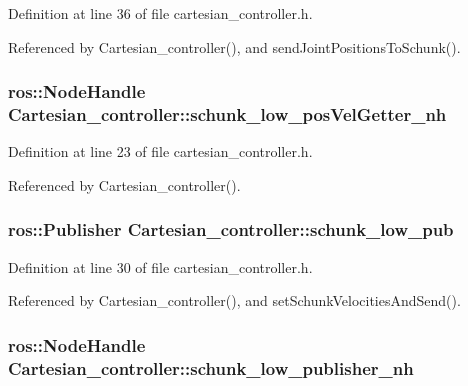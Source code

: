 Definition at line 36 of file cartesian\-\_\-controller.\-h.



Referenced by Cartesian\-\_\-controller(), and send\-Joint\-Positions\-To\-Schunk().

\hypertarget{classCartesian__controller_aeed01809bd5240663c7acfade245a386}{
\subsubsection[{schunk\-\_\-low\-\_\-pos\-Vel\-Getter\-\_\-nh}]{\setlength{\rightskip}{0pt plus 5cm}ros\-::\-Node\-Handle Cartesian\-\_\-controller\-::schunk\-\_\-low\-\_\-pos\-Vel\-Getter\-\_\-nh\hspace{0.3cm}{\ttfamily [protected]}}}\label{classCartesian__controller_aeed01809bd5240663c7acfade245a386}


Definition at line 23 of file cartesian\-\_\-controller.\-h.



Referenced by Cartesian\-\_\-controller().

\hypertarget{classCartesian__controller_aa6ce9cffdd307127ed814d6e5132eba2}{
\subsubsection[{schunk\-\_\-low\-\_\-pub}]{\setlength{\rightskip}{0pt plus 5cm}ros\-::\-Publisher Cartesian\-\_\-controller\-::schunk\-\_\-low\-\_\-pub\hspace{0.3cm}{\ttfamily [protected]}}}\label{classCartesian__controller_aa6ce9cffdd307127ed814d6e5132eba2}


Definition at line 30 of file cartesian\-\_\-controller.\-h.



Referenced by Cartesian\-\_\-controller(), and set\-Schunk\-Velocities\-And\-Send().

\hypertarget{classCartesian__controller_a7df4ce63bf0551bfa7061bc718cd68d2}{
\subsubsection[{schunk\-\_\-low\-\_\-publisher\-\_\-nh}]{\setlength{\rightskip}{0pt plus 5cm}ros\-::\-Node\-Handle Cartesian\-\_\-controller\-::schunk\-\_\-low\-\_\-publisher\-\_\-nh\hspace{0.3cm}{\ttfamily [protected]}}}\label{classCartesian__controller_a7df4ce63bf0551bfa7061bc718cd68d2}


